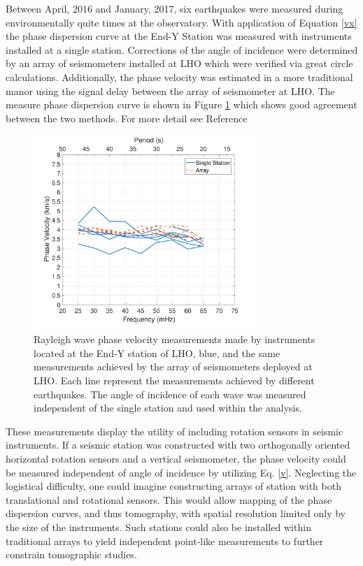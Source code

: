 \documentclass [12pt, proquest]{uwthesis}[2019]
\begin{document}
Between April, 2016 and January, 2017, six earthquakes were measured during environmentally quite times at the observatory. \cite{tiltSeismology} With application of Equation \ref{vx} the phase dispersion curve at the End-Y Station was measured with instruments installed at a single station. Corrections of the angle of incidence were determined by an array of seismometers installed at LHO which were verified via great circle calculations. Additionally, the phase velocity was estimated in a more traditional manor using the signal delay between the array of seismometer at LHO. The measure phase dispersion curve is shown in Figure \ref{Phase_Hanford} which shows good agreement between the two methods. For more detail see Reference \cite{tiltSeismology}
 
\begin{figure}%
\begin{center}
\includegraphics[width=0.75\textwidth]{Vel.pdf}
\caption[Single station Rayleigh wave phase velocity measurements]{Rayleigh wave phase velocity measurements made by instruments located at the End-Y station of LHO, blue, and the same measurements achieved by the array of seismometers deployed at LHO. Each line represent the measurements achieved by different earthquakes. The angle of incidence of each wave was measured independent of the single station and used within the analysis. \cite{tiltSeismology}}
\label{Phase_Hanford}
\end{center}
\end{figure}

These measurements display the utility of including rotation sensors in seismic instruments. If a seismic station was constructed with two orthogonally oriented horizontal rotation sensors and a vertical seismometer, the phase velocity could be measured independent of angle of incidence by utilizing Eq. \ref{v}. Neglecting the logistical difficulty, one could imagine constructing arrays of station with both translational and rotational sensors. This would allow mapping of the phase dispersion curves, and thus tomography, with spatial resolution limited only by the size of the instruments. Such stations could also be installed within traditional arrays to yield independent point-like measurements to further constrain tomographic studies.
\end{document}
